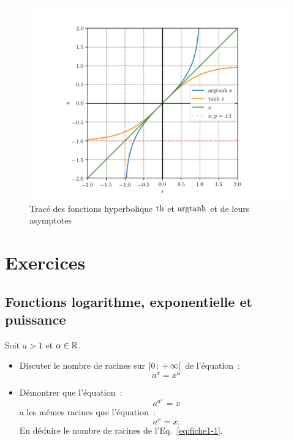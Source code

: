 \begin{figure}
  \centering
  \includegraphics[scale = 0.8]{argtanh.png}
  \caption{Tracé des fonctions hyperbolique \(\operatorname{th}\) et \(\operatorname{argtanh}\) et de leurs
  asymptotes}\label{fig:tracetanhargth}
\end{figure}

\section{Exercices}
\subsection{Fonctions logarithme, exponentielle et puissance}

\begin{exercice}
  Soit \(a > 1\) et \(\alpha \in \mathbb{R}\).
  \begin{itemize}
    \item Discuter le nombre de racines sur \(\left] 0 \, ; {} +\infty \right[\) de
      l'équation~:
      \begin{equation}\label{eq:fiche1-1}
        a^x = x^\alpha
      \end{equation}
    \item Démontrer que l'équation~:
      \begin{equation}
        a^{a^x} = x
      \end{equation}
      a les mêmes racines que l'équation~:
      \begin{equation}
        a^x = x.
      \end{equation}
      En déduire le nombre de racines de l'Eq.~\eqref{eq:fiche1-1}.
  \end{itemize}
\end{exercice}

